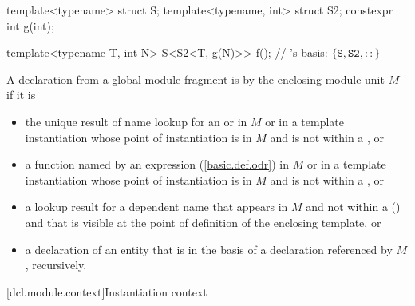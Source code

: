 \begin{std.txt}
\begin{note}
\begin{example}
\begin{codeblock}
template<typename> struct S;
template<typename, int> struct S2;
constexpr int g(int);

template<typename T, int N>
S<S2<T, g(N)>> f();                     // 's basis: $\{ \mathtt{S}, \mathtt{S2}, \mathtt{::} \}$ 
\end{codeblock}
\end{example}
\end{note}

\alinea
A declaration from a global module fragment is 
by the enclosing module unit $M$ if it is
\begin{itemize}
\item
the unique result of name lookup for an
 or  in $M$
or in a template instantiation whose point of instantiation is in $M$
and is not within a , or
\item
a function named by an expression (\ref{basic.def.odr}) in $M$
or in a template instantiation whose point of instantiation is in $M$
and is not within a , or
\item
a lookup result for a dependent name that appears in $M$
and not within a 
()
and
that is visible at the point of definition of the enclosing template, or
\item
a declaration of an entity that is in the basis of a declaration referenced
by $M$, recursively.
\end{itemize}
\end{std.txt}

[dcl.module.context]{Instantiation context}

